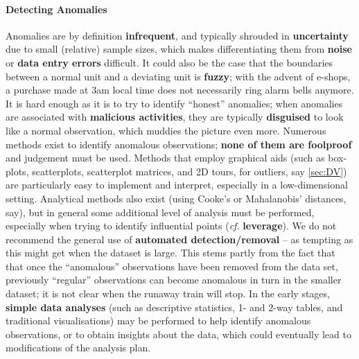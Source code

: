 \paragraph{Detecting Anomalies}  Anomalies are by definition \textbf{infrequent}, and typically shrouded in \textbf{uncertainty} due to small (relative) sample sizes, which makes differentiating them from \textbf{noise} or \textbf{data entry errors} difficult. It could also be the case that the boundaries between a normal unit and a deviating unit is \textbf{fuzzy}; with the advent of e-shops, a purchase made at 3am local time does not necessarily ring alarm bells anymore. It is hard enough as it is to try to identify ``honest'' anomalies; when anomalies are associated with \textbf{malicious activities}, they are typically \textbf{disguised} to look like a normal observation, which muddies the picture even more. 
\newl
Numerous methods exist to identify anomalous observations; \textbf{none of them are foolproof} and judgement must be used. Methods that employ graphical aids (such as box-plots, scatterplots, scatterplot matrices, and 2D tours, for outliers, say \ref{sec:DV}) are particularly easy to implement and interpret, especially in a low-dimensional setting. Analytical methods also exist (using Cooke's or Mahalanobis' distances, say), but in general some additional level of analysis must be performed, especially when trying to identify influential points (\textit{cf.} \textbf{leverage}). 
\newl We do not recommend the general use of \textbf{automated detection/removal} -- as tempting as this might get when the dataset is large. This stems partly from the fact that that once the ``anomalous'' observations have been removed from the data set, previously ``regular'' observations can become anomalous in turn in the smaller dataset; it is not clear when the runaway train will stop.  \newl 
In the early stages, \textbf{simple data analyses} (such as descriptive statistics, 1- and 2-way tables, and  traditional visualisations) may be performed to help identify anomalous observations, or to obtain insights about the data, which could eventually lead to modifications of the analysis plan.
